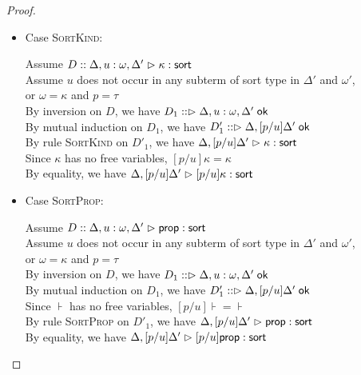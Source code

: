 \begin{proof}
\begin{enumerate}
  \begin{itemize}
  \item Case \textsc{SortKind}: 
    \begin{tabbedproof}
      \oo Assume $D :: \judgeSort[\Delta, u:\omega, \Delta']{\kappa}$ \\
      \oo Assume $u$ does not occur in any subterm of sort type in $\Delta'$ and $\omega'$, \\
      \ox or $\omega = \kappa$ and $p = \tau$\\
      \ooo By inversion on $D$, we have $D_1 :: \judgeACtx{\Delta, u:\omega, \Delta'}$ \\
      \ooo By mutual induction on $D_1$, we have 
             $D'_1 :: \judgeACtx{\Delta, [p/u]\Delta'}$ \\
      \ooo By rule \textsc{SortKind} on $D'_1$, we have 
             $\judgeSort[{\Delta, [p/u]\Delta'}]{\kappa}$ \\
      \ooo Since $\kappa$ has no free variables, $[p/u]\kappa = \kappa$ \\
      \ooo By equality, we have 
             $\judgeSort[{\Delta, [p/u]\Delta'}]{[p/u]\kappa}$ \\
    \end{tabbedproof}

  \item Case \textsc{SortProp}: 
    \begin{tabbedproof}
      \oo Assume $D :: \judgeSort[\Delta, u:\omega, \Delta']{\assert}$ \\
      \oo Assume $u$ does not occur in any subterm of sort type in $\Delta'$ and $\omega'$, \\
      \ox or $\omega = \kappa$ and $p = \tau$\\
      \ooo By inversion on $D$, we have $D_1 :: \judgeACtx{\Delta, u:\omega, \Delta'}$ \\
      \ooo By mutual induction on $D_1$, we have 
             $D'_1 :: \judgeACtx{\Delta, [p/u]\Delta'}$ \\
      \ooo Since $\assert$ has no free variables, $[p/u]\assert = \assert$ \\
      \ooo By rule \textsc{SortProp} on $D'_1$, we have 
             $\judgeSort[{\Delta, [p/u]\Delta'}]{\assert}$ \\
      \ooo By equality, we have 
             $\judgeSort[{\Delta, [p/u]\Delta'}]{[p/u]\assert}$ \\
    \end{tabbedproof}


\end{itemize}
\end{enumerate}
\end{proof}
